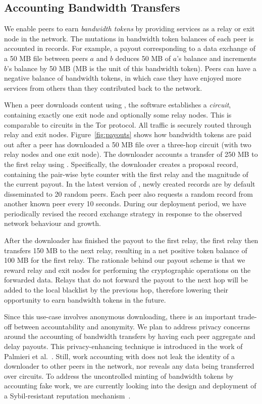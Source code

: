 \subsection{Accounting Bandwidth Transfers}
We enable peers to earn \emph{bandwidth tokens} by providing services as a relay or exit node in the \Tribler{} network.
The mutations in bandwidth token balances of each peer is accounted in \TrustChain{} records.
For example, a payout corresponding to a data exchange of a 50 MB file between peers $ a $ and $ b $ deduces 50 MB of $ a $'s balance and increments $ b $'s balance by 50 MB (MB is the unit of this bandwidth token).
Peers can have a negative balance of bandwidth tokens, in which case they have enjoyed more services from others than they contributed back to the network.

When a peer downloads content using \Tribler{}, the \Tribler{} software establishes a \emph{circuit}, containing exactly one exit node and optionally some relay nodes.
This is comparable to circuits in the Tor protocol.
All traffic is securely routed through relay and exit nodes.
Figure~\ref{fig:payouts} shows how bandwidth tokens are paid out after a peer has downloaded a 50 MB file over a three-hop circuit (with two relay nodes and one exit node).
The downloader accounts a transfer of 250 MB to the first relay using \TrustChain{}.
Specifically, the downloader creates a proposal record, containing the pair-wise byte counter with the first relay and the magnitude of the current payout.
In the latest version of \Tribler{}, newly created records are by default disseminated to 20 random peers.
Each peer also requests a random record from another known peer every 10 seconds.
During our deployment period, we have periodically revised the record exchange strategy in response to the observed network behaviour and growth.

After the downloader has finished the payout to the first relay, the first relay then transfers 150 MB to the next relay, resulting in a net positive token balance of 100 MB for the first relay.
The rationale behind our payout scheme is that we reward relay and exit nodes for performing the cryptographic operations on the forwarded data.
Relays that do not forward the payout to the next hop will be added to the local blacklist by the previous hop, therefore lowering their opportunity to earn bandwidth tokens in the future.

Since this use-case involves anonymous downloading, there is an important trade-off between accountability and anonymity.
We plan to address privacy concerns around the accounting of bandwidth transfers by having each peer aggregate and delay payouts.
This privacy-enhancing technique is introduced in the work of Palmieri et al.~\cite{palmieri2015paying}.
Still, work accounting with \TrustChain{} does not leak the identity of a downloader to other peers in the network, nor reveals any data being transferred over circuits.
To address the uncontrolled minting of bandwidth tokens by accounting fake work, we are currently looking into the design and deployment of a Sybil-resistant reputation mechanism~\cite{otte2017trustchain}.

